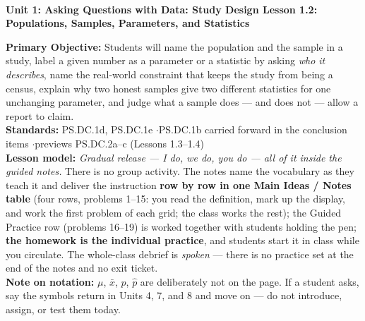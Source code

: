 \documentclass[10pt]{article}
\newcommand{\UnitNumberName}{Unit 1: Asking Questions with Data: Study Design \quad}
\newcommand{\LessonNumberName}{Lesson 1.2: Populations, Samples, Parameters, and Statistics}
\begin{document}
\begin{center}
    {\Large\bfseries \CourseName \\
    {\small\bfseries \UnitNumberName \LessonNumberName}}
\end{center}

\begin{tcolorbox}[colback=frost, colframe=cerulean, boxrule=0.9pt, arc=2mm,
    left=2mm, right=2mm, top=1.5mm, bottom=1.5mm]
    \textbf{Primary Objective:} Students will name the population and the sample in a study,
    label a given number as a parameter or a statistic by asking \emph{who it describes},
    name the real-world constraint that keeps the study from being a census, explain why two
    honest samples give two different statistics for one unchanging parameter, and judge
    what a sample does --- and does not --- allow a report to claim.
    \\[2pt]
    \textbf{Standards:} PS.DC.1d, PS.DC.1e \quad$\cdot$\quad PS.DC.1b carried forward in the
    conclusion items \quad$\cdot$\quad previews PS.DC.2a--c (Lessons 1.3--1.4)
    \\[2pt]
    \textbf{Lesson model:} \emph{Gradual release --- I do, we do, you do --- all of it inside
    the guided notes.} There is no group activity. The notes name the vocabulary as they teach
    it and deliver the instruction \textbf{row by row in one Main Ideas / Notes table} (four
    rows, problems 1--15: you read the definition, mark up the display, and work the first
    problem of each grid; the class works the rest); the Guided Practice row (problems 16--19)
    is worked together with students holding the pen; \textbf{the homework is the individual practice}, and students
    start it in class while you circulate. The whole-class debrief is \emph{spoken} --- there is
    no practice set at the end of the notes and no exit ticket.
    \\[2pt]
    \textbf{Note on notation:} $\mu$, $\bar{x}$, $p$, $\hat{p}$ are deliberately not on the
    page. If a student asks, say the symbols return in Units 4, 7, and 8 and move on --- do not
    introduce, assign, or test them today.
\end{tcolorbox}
\end{document}
